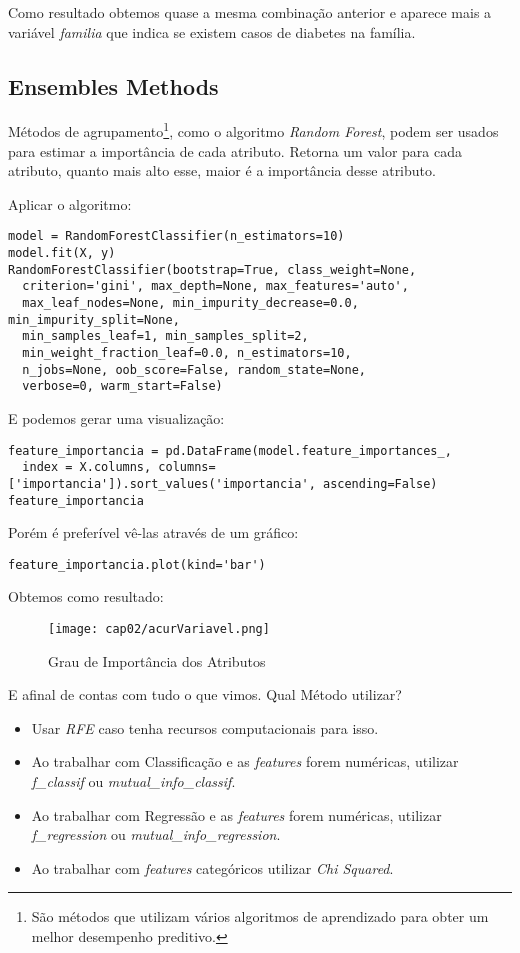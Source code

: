 Como resultado obtemos quase a mesma combinação anterior e aparece mais a variável \textit{familia } que indica se existem casos de diabetes na família.

\subsection{Ensembles Methods}
Métodos de agrupamento\footnote{São métodos que utilizam vários algoritmos de aprendizado para obter um melhor desempenho preditivo.}, como o algoritmo \textit{Random Forest}, podem ser usados para estimar a importância de cada atributo. Retorna um valor para cada atributo, quanto mais alto esse, maior é a importância desse atributo.

Aplicar o algoritmo:
\begin{lstlisting}
model = RandomForestClassifier(n_estimators=10)
model.fit(X, y)
RandomForestClassifier(bootstrap=True, class_weight=None,
  criterion='gini', max_depth=None, max_features='auto',
  max_leaf_nodes=None, min_impurity_decrease=0.0, min_impurity_split=None,
  min_samples_leaf=1, min_samples_split=2,
  min_weight_fraction_leaf=0.0, n_estimators=10,
  n_jobs=None, oob_score=False, random_state=None,
  verbose=0, warm_start=False)
\end{lstlisting}

E podemos gerar uma visualização:
\begin{lstlisting}
feature_importancia = pd.DataFrame(model.feature_importances_,
  index = X.columns, columns=['importancia']).sort_values('importancia', ascending=False)
feature_importancia
\end{lstlisting}

Porém é preferível vê-las através de um gráfico:
\begin{lstlisting}
feature_importancia.plot(kind='bar')
\end{lstlisting}

Obtemos como resultado:
\begin{figure}[H]
	\centering
	\texttt{[image: cap02/acurVariavel.png]}
	\caption{Grau de Importância dos Atributos}
\end{figure}

E afinal de contas com tudo o que vimos. Qual Método utilizar?
\begin{itemize}[nolistsep]
	\item Usar \textit{RFE} caso tenha recursos computacionais para isso.
	\item Ao trabalhar com Classificação e as \textit{features} forem numéricas, utilizar \textit{f\_classif} ou \textit{mutual\_info\_classif}.
	\item Ao trabalhar com Regressão e as \textit{features} forem numéricas, utilizar \textit{f\_regression} ou \textit{mutual\_info\_regression}.
	\item Ao trabalhar com \textit{features} categóricos utilizar \textit{Chi Squared}.
\end{itemize}

